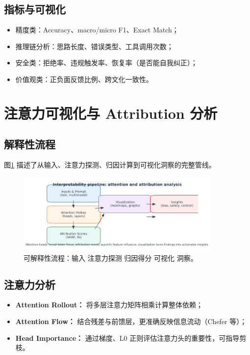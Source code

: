 \documentclass[UTF8,zihao=-4]{ctexart}
\begin{document}
\subsection{指标与可视化}
\begin{itemize}
  \item 精度类：Accuracy、macro/micro F1、Exact Match；
  \item 推理链分析：思路长度、错误类型、工具调用次数；
  \item 安全类：拒绝率、违规触发率、恢复率（是否能自我纠正）；
  \item 价值观类：正负面反馈比例、跨文化一致性。
\end{itemize}

\section{注意力可视化与 Attribution 分析}
\subsection{解释性流程}
图\ref{fig:interpretability_pipeline_cn} 描述了从输入、注意力探测、归因计算到可视化洞察的完整管线。
\begin{figure}[H]
  \centering
  \includegraphics[width=0.9\textwidth]{interpretability_pipeline.png}
  \caption{可解释性流程：输入 \textrightarrow{} 注意力探测 \textrightarrow{} 归因得分 \textrightarrow{} 可视化 \textrightarrow{} 洞察。}
  \label{fig:interpretability_pipeline_cn}
\end{figure}

\subsection{注意力分析}
\begin{itemize}
  \item \textbf{Attention Rollout：} 将多层注意力矩阵相乘计算整体依赖；
  \item \textbf{Attention Flow：} 结合残差与前馈层，更准确反映信息流动（Chefer 等）；
  \item \textbf{Head Importance：} 通过梯度、L0 正则评估注意力头的重要性，可指导剪枝。
\end{itemize}
\end{document}
